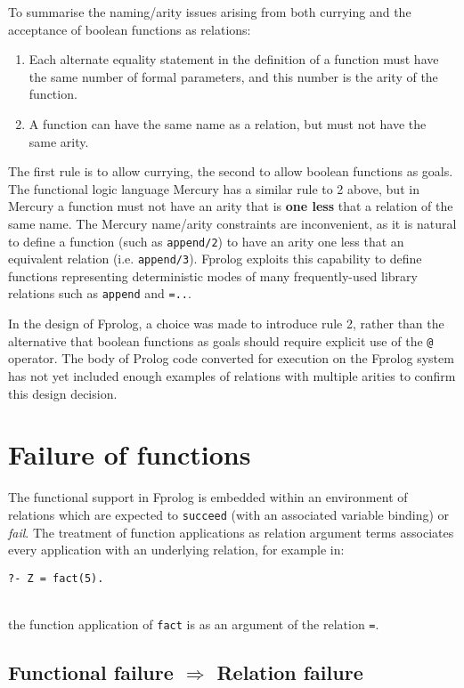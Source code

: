 \documentclass[a4paper,11pt,twoside]{article}
\begin{document}
To summarise the naming/arity issues arising from both currying and the
acceptance of boolean functions as relations:
\begin{enumerate}
\item{Each alternate equality statement in the definition of a function must
  have the same number of formal parameters, and this number is the arity of
  the function.}
\item{A function can have the same name as a relation, but must not have
  the same arity.}
\end{enumerate}
The first rule is to allow currying, the second to allow boolean functions as
goals.  The functional logic language Mercury has a similar rule to 2 above,
but in Mercury a function must not have an arity that is \textbf{one less} that a
relation of the same name.  The Mercury name/arity constraints are inconvenient,
as it is natural to define a function (such as \texttt{append/2}) to have an
arity one less that an equivalent relation (i.e. \texttt{append/3}).  Fprolog
exploits this capability to define functions representing deterministic modes
of many frequently-used
library relations such as \texttt{append} and \texttt{=..}.

In the design of Fprolog, a choice was made to introduce rule 2, rather than
the alternative that boolean functions as goals should require explicit use of 
the \texttt{@} operator.  The body of Prolog code converted for execution on
the Fprolog system has not yet included enough examples of relations with
multiple arities to confirm this design decision.

\section{Failure of functions} %
\label{fail}

The functional support in Fprolog is embedded within an environment of
relations which are expected to \texttt{succeed} (with an associated
variable binding) or \textit{fail}.  The treatment of function applications as
relation argument terms associates every application with an underlying relation,
for example in:\\
\centerline{\texttt{?- Z = fact(5).}}\\
the function application of \texttt{fact} is as an argument of the
relation \texttt{=}.

\subsection{Functional failure $\Rightarrow$ Relation failure}
\label{func_fail}
\end{document}
